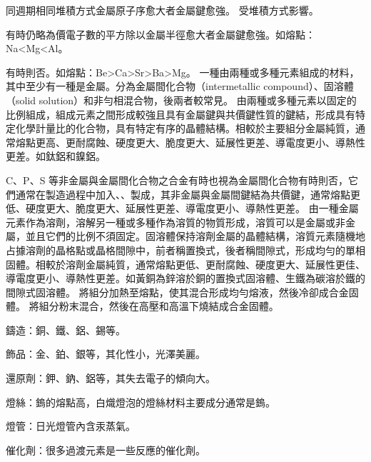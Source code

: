 \documentclass[a4paper,12pt]{report}
\begin{document}
\item 同週期相同堆積方式金屬原子序愈大者金屬鍵愈強。
\eit
{}
受堆積方式影響。
\bit
\item 有時仍略為價電子數的平方除以金屬半徑愈大者金屬鍵愈強。如熔點：Na<Mg<Al。
\item 有時則否。如熔點：Be>Ca>Sr>Ba>Mg。
\eit
{}
一種由兩種或多種元素組成的材料，其中至少有一種是金屬。分為金屬間化合物（intermetallic compound）、固溶體（solid solution）和非勻相混合物，後兩者較常見。
由兩種或多種元素以固定的比例組成，組成元素之間形成較強且具有金屬鍵與共價鍵性質的鍵結，形成具有特定化學計量比的化合物，具有特定有序的晶體結構。相較於主要組分金屬純質，通常熔點更高、更耐腐蝕、硬度更大、脆度更大、延展性更差、導電度更小、導熱性更差。如鈦鋁和鎳鋁。

C、P、S 等非金屬與金屬間化合物之合金有時也視為金屬間化合物有時則否，它們通常在製造過程中加入、、製成，其非金屬與金屬間鍵結為共價鍵，通常熔點更低、硬度更大、脆度更大、延展性更差、導電度更小、導熱性更差。
由一種金屬元素作為溶劑，溶解另一種或多種作為溶質的物質形成，溶質可以是金屬或非金屬，並且它們的比例不須固定。固溶體保持溶劑金屬的晶體結構，溶質元素隨機地占據溶劑的晶格點或晶格間隙中，前者稱置換式，後者稱間隙式，形成均勻的單相固體。相較於溶劑金屬純質，通常熔點更低、更耐腐蝕、硬度更大、延展性更佳、導電度更小、導熱性更差。如黃銅為鋅溶於銅的置換式固溶體、生鐵為碳溶於鐵的間隙式固溶體。
將組分加熱至熔點，使其混合形成均勻熔液，然後冷卻成合金固體。
將組分粉末混合，然後在高壓和高溫下燒結成合金固體。
\bit
\item 鑄造：銅、鐵、鋁、錫等。
\item 飾品：金、鉑、銀等，其化性小，光澤美麗。
\item 還原劑：鉀、鈉、鋁等，其失去電子的傾向大。
\item 燈絲：鎢的熔點高，白熾燈泡的燈絲材料主要成分通常是鎢。
\item 燈管：日光燈管內含汞蒸氣。
\item 催化劑：很多過渡元素是一些反應的催化劑。
\eit
\end{document}
